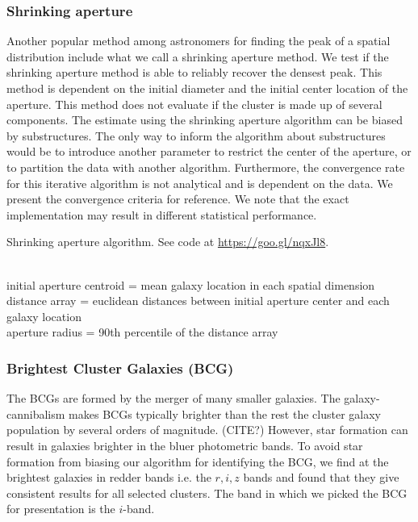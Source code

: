 \subsubsection{Shrinking aperture}
Another popular method among astronomers for finding the peak of a spatial
distribution include what we call a shrinking aperture method.
We test if the shrinking aperture method is able to reliably recover the 
densest peak.
This method is dependent on the initial diameter and the initial center 
location of the aperture.
This method does not evaluate if the cluster is made up of
several components.
The estimate using the shrinking aperture algorithm can be biased by
substructures. The only way to inform the algorithm about substructures would
be to introduce another parameter to restrict the center of the aperture, or to
partition the data with another algorithm.
Furthermore, the convergence rate for this iterative algorithm is not
analytical and is dependent on the data. We present the
convergence criteria for reference. 
We note that the exact implementation may result in different statistical 
performance.
\begin{algorithm}
	\caption{Shrinking aperture algorithm. See code at
		\href{https://goo.gl/nqxJl8}{https://goo.gl/nqxJl8}.
	}
	 \hrulefill \\

	 initial aperture centroid = mean galaxy location in each spatial dimension\\
 	distance array = euclidean distances between initial aperture center and each galaxy
	location \\
 	aperture radius = 90th percentile of the distance array\\ 
	   \hrulefill
 \end{algorithm}


\subsubsection{Brightest Cluster Galaxies (BCG)}
The BCGs are formed by the merger of many smaller
galaxies. The galaxy-cannibalism makes BCGs typically brighter than the rest 
the cluster galaxy population by several orders of magnitude. (CITE?)
However, star formation can result
in galaxies brighter in the bluer photometric bands.
To avoid star formation from biasing our algorithm for identifying the
BCG, we find at the brightest galaxies in redder bands i.e. the $r, i, z$
bands and found that they give consistent results for all selected clusters. 
The band in which we picked the BCG for presentation is the $i$-band. 

